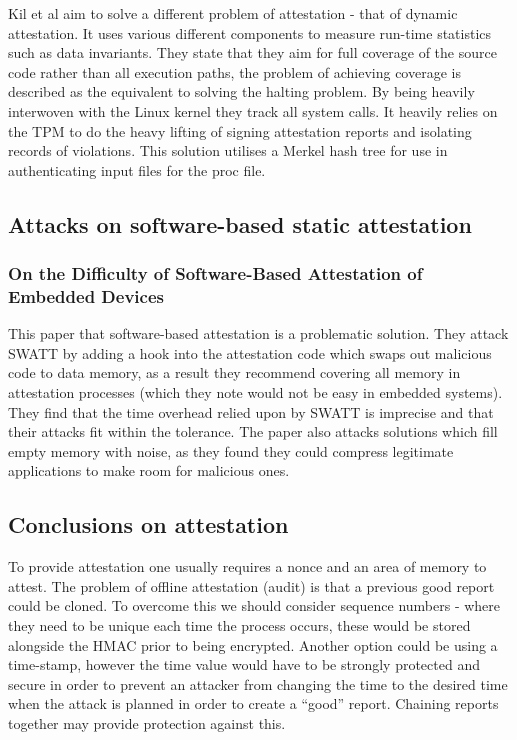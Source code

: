 Kil et al \cite{Kil2009} aim to solve a different problem of attestation - that of dynamic attestation. It uses various different components to measure run-time statistics such as data invariants. They state that they aim for full coverage of the source code rather than all execution paths, the problem of achieving coverage is described as the equivalent to solving the halting problem. By being heavily interwoven with the Linux kernel they track all system calls. It heavily relies on the TPM to do the heavy lifting of signing attestation reports and isolating records of violations. This solution utilises a Merkel hash tree for use in authenticating input files for the proc file.

\subsection{Attacks on software-based static attestation} \label{attestationSolutionsAttacks}

\subsubsection{On the Difficulty of Software-Based Attestation of Embedded Devices}

This paper \cite{Castelluccia2009} that software-based attestation is a problematic solution. They attack SWATT \cite{Seshadri2004} by adding a hook into the attestation code which swaps out malicious code to data memory, as a result they recommend covering all memory in attestation processes (which they note would not be easy in embedded systems). They find that the time overhead relied upon by SWATT \cite{Seshadri2004} is imprecise and that their attacks fit within the tolerance. The paper also attacks solutions which fill empty memory with noise, as they found they could compress legitimate applications to make room for malicious ones.

\subsection{Conclusions on attestation} \label{attestationConclusion}

To provide attestation one usually requires a nonce and an area of memory to attest. The problem of offline attestation (audit) is that a previous good report could be cloned. To overcome this we should consider sequence numbers - where they need to be unique each time the process occurs, these would be stored alongside the HMAC prior to being encrypted. Another option could be using a time-stamp, however the time value would have to be strongly protected and secure in order to prevent an attacker from changing the time to the desired time when the attack is planned in order to create a ``good'' report. Chaining reports together may provide protection against this.

